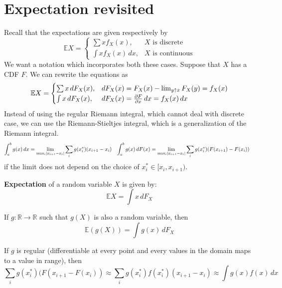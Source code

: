 \documentclass{huhtakm-template-book}
\newcommand{\expect}{\mathbb{E}}
\begin{document}
\section{Expectation revisited}
    Recall that the expectations are given respectively by
    \begin{equation*}
        \expect X=\begin{cases}
            \sum xf_{X}(x), &X\text{ is discrete}\\
            \int xf_{X}(x)\,dx, &X\text{ is continuous}
        \end{cases}
    \end{equation*}
    We want a notation which incorporates both these cases. Suppose that $X$ has a CDF $F$. We can rewrite the equations as
    \begin{equation*}
        \expect X=\begin{cases}
            \sum x\,dF_{X}(x), &dF_{X}(x)=F_{X}(x)-\lim_{y\uparrow x}F_{X}(y)=f_{X}(x)\\
            \int x\,dF_{X}(x), &dF_{X}(x)=\pdv{F}{x}\,dx=f_{X}(x)\,dx
        \end{cases}
    \end{equation*}
    Instead of using the regular Riemann integral, which cannot deal with discrete case, we can use the Riemann-Stieltjes integral, which is a generalization of the Riemann integral.
    \begin{align*}
        \int_{a}^{b}g(x)\,dx&=\lim_{\max_{i}\left|{x_{i+1}-x_{i}}\right|}\sum_{i}g(x_{i}^{*})(x_{i+1}-x_{i}) & \int_{a}^{b}g(x)\,dF(x)&=\lim_{\max_{i}\left|{x_{i+1}-x_{i}}\right|}\sum_{i}g(x_{i}^{*})(F(x_{i+1})-F(x_{i}))
    \end{align*}
    if the limit does not depend on the choice of $x_{i}^{*}\in[x_{i},x_{i+1})$.
    \begin{defn}
        \textbf{Expectation} of a random variable $X$ is given by:
        \begin{equation*}
            \expect X=\int x\,dF_{X}
        \end{equation*}
    \end{defn}
    \begin{lem}
        If $g:\mathbb{R}\to\mathbb{R}$ such that $g(X)$ is also a random variable, then
        \begin{equation*}
            \expect(g(X))=\int g(x)\,dF_{X}
        \end{equation*}
    \end{lem}
    \begin{eg}
        If $g$ is regular (differentiable at every point and every values in the domain maps to a value in range), then
        \begin{equation*}
            \sum_{i}g(x_{i}^{*})(F(x_{i+1}-F(x_{i}))\approx\sum_{i}g(x_{i}^{*})f(x_{i}^{*})(x_{i+1}-x_{i})\approx\int g(x)f(x)\,dx
        \end{equation*}
    \end{eg}
\end{document}
